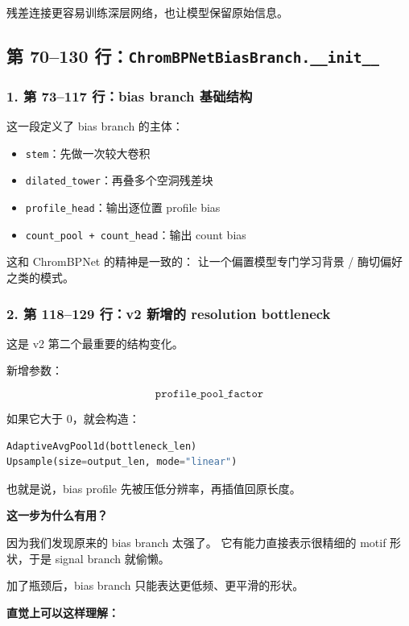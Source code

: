 \documentclass[11pt,a4paper]{ctexart}
\begin{document}
残差连接更容易训练深层网络，也让模型保留原始信息。

\subsection{第 70--130 行：\texttt{ChromBPNetBiasBranch.\_\_init\_\_}}

\subsubsection*{1. 第 73--117 行：bias branch 基础结构}

这一段定义了 bias branch 的主体：

\begin{itemize}[leftmargin=2em]
\item \texttt{stem}：先做一次较大卷积
\item \texttt{dilated\_tower}：再叠多个空洞残差块
\item \texttt{profile\_head}：输出逐位置 profile bias
\item \texttt{count\_pool + count\_head}：输出 count bias
\end{itemize}

这和 ChromBPNet 的精神是一致的：
让一个偏置模型专门学习背景 / 酶切偏好之类的模式。

\subsubsection*{2. 第 118--129 行：v2 新增的 resolution bottleneck}

这是 v2 第二个最重要的结构变化。

新增参数：

\[
\texttt{profile\_pool\_factor}
\]

如果它大于 0，就会构造：

\begin{lstlisting}[language=Python]
AdaptiveAvgPool1d(bottleneck_len)
Upsample(size=output_len, mode="linear")
\end{lstlisting}

也就是说，bias profile 先被压低分辨率，再插值回原长度。

\textbf{这一步为什么有用？}

因为我们发现原来的 bias branch 太强了。
它有能力直接表示很精细的 motif 形状，于是 signal branch 就偷懒。

加了瓶颈后，bias branch 只能表达更低频、更平滑的形状。

\textbf{直觉上可以这样理解：}
\end{document}
